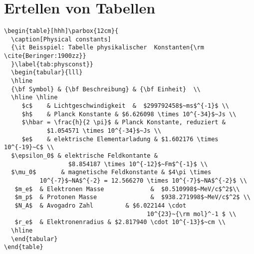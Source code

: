 \section{Ertellen von Tabellen}
\label{ch:Kapitel1:sec:Tabellen}

\begin{verbatim}
\begin{table}[hhh]\parbox{12cm}{
  \caption[Physical constants]
  {\it Beisspiel: Tabelle physikalischer  Konstanten{\rm \cite{Beringer:1900zz}}
  }\label{tab:physconst}}
  \begin{tabular}{lll}
  \hline
  {\bf Symbol} & {\bf Beschreibung} & {\bf Einheit}  \\
  \hline \hline
     $c$    & Lichtgeschwindigkeit  &  $299792458$~ms$^{-1}$ \\
     $h$    & Planck Konstante & $6.626098 \times 10^{-34}$~Js \\
     $\hbar = \frac{h}{2 \pi}$ & Planck Konstante, reduziert &
            $1.054571 \times 10^{-34}$~Js \\
     $e$    & elektrische Elementarladung & $1.602176 \times 10^{-19}~C$ \\ 
  $\epsilon_0$ & elektrische Feldkontante & 
                  $8.854187 \times 10^{-12}$~Fm$^{-1}$ \\
  $\mu_0$       & magnetische Feldkonstante & $4\pi \times 
          10^{-7}$~NA$^{-2} = 12.566270 \times 10^{-7}$~NA$^{-2}$ \\
   $m_e$  & Elektronen Masse             &  $0.510998$~MeV/c$^2$\\
   $m_p$  & Protonen Masse               &  $938.271998$~MeV/c$^2$ \\        
   $N_A$  & Avogadro Zahl         & $6.022144 \cdot 
                                        10^{23}~{\rm mol}^-1 $ \\
   $r_e$  & Elektronenradius & $2.817940 \cdot 10^{-13}$~cm \\                                     
  \hline
  \end{tabular}
\end{table}
\end{verbatim}

